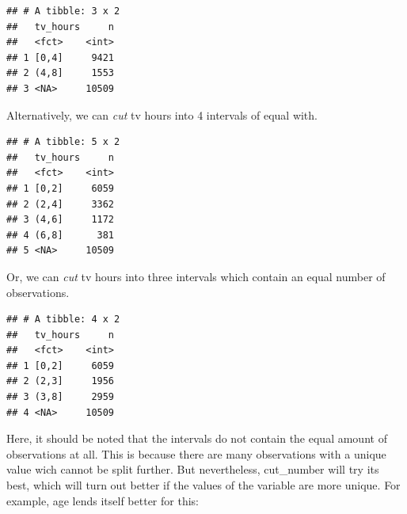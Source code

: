 \documentclass[]{tufte-book}
\newenvironment{Shaded}{}{}
\newcommand{\DataTypeTok}[1]{\textcolor[rgb]{0.56,0.13,0.00}{#1}}
\newcommand{\DecValTok}[1]{\textcolor[rgb]{0.25,0.63,0.44}{#1}}
\newcommand{\KeywordTok}[1]{\textcolor[rgb]{0.00,0.44,0.13}{\textbf{#1}}}
\newcommand{\NormalTok}[1]{#1}
\newcommand{\OperatorTok}[1]{\textcolor[rgb]{0.40,0.40,0.40}{#1}}
\newcommand{\StringTok}[1]{\textcolor[rgb]{0.25,0.44,0.63}{#1}}
\begin{document}
\begin{verbatim}
## # A tibble: 3 x 2
##   tv_hours     n
##   <fct>    <int>
## 1 [0,4]     9421
## 2 (4,8]     1553
## 3 <NA>     10509
\end{verbatim}

Alternatively, we can \emph{cut} tv hours into 4 intervals of equal with.

\begin{Shaded}
\end{Shaded}

\begin{verbatim}
## # A tibble: 5 x 2
##   tv_hours     n
##   <fct>    <int>
## 1 [0,2]     6059
## 2 (2,4]     3362
## 3 (4,6]     1172
## 4 (6,8]      381
## 5 <NA>     10509
\end{verbatim}

Or, we can \emph{cut} tv hours into three intervals which contain an equal number of observations.

\begin{Shaded}
\end{Shaded}

\begin{verbatim}
## # A tibble: 4 x 2
##   tv_hours     n
##   <fct>    <int>
## 1 [0,2]     6059
## 2 (2,3]     1956
## 3 (3,8]     2959
## 4 <NA>     10509
\end{verbatim}

Here, it should be noted that the intervals do not contain the equal amount of observations at all. This is because there are many observations with a unique value wich cannot be split further. But nevertheless, cut\_number will try its best, which will turn out better if the values of the variable are more unique. For example, age lends itself better for this:
\end{document}
